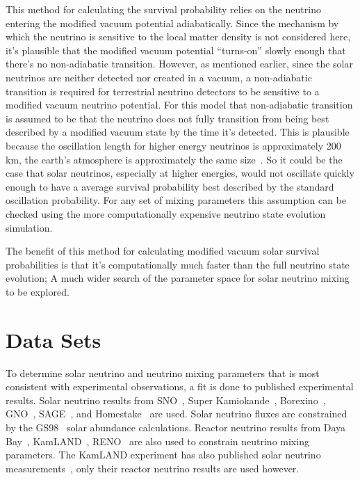This method for calculating the survival probability relies
on the neutrino entering the modified vacuum potential adiabatically.
Since the mechanism by which the neutrino is sensitive to the local matter
density is not considered here, it's plausible that the modified
vacuum potential ``turns-on'' slowly enough that there's no non-adiabatic
transition.
However, as mentioned earlier, since the solar neutrinos are neither
detected nor created in a vacuum, a non-adiabatic transition is required
for terrestrial neutrino detectors to be sensitive to a modified vacuum
neutrino potential.
For this model that non-adiabatic transition is assumed to be that the
neutrino does not fully transition from being best described
by a modified vacuum state by the time it's detected.
This is plausible because the oscillation length for higher
energy neutrinos is approximately 200\,km, the earth's atmosphere
is approximately the same size~\citep{atmosphere_profile}.
So it could be the case that solar neutrinos, especially at higher
energies, would not oscillate quickly enough to have a average
survival probability best described by the standard oscillation
probability.
For any set of mixing parameters this assumption can be checked using the
more computationally expensive neutrino state evolution simulation.

The benefit of this method for calculating modified vacuum solar survival
probabilities is that it's computationally much faster than the full
neutrino state evolution;
A much wider search of the parameter space for solar neutrino
mixing to be explored.

\section{Data Sets}
To determine solar neutrino and neutrino mixing parameters that is most
consistent with experimental observations, a fit is done to published
experimental results.
Solar neutrino results from SNO~\citep{sno_combined}, Super
Kamiokande~\citep{superk4, superk_first_solar,superk2, superk3},
Borexino~\citep{borexino_final_results,borexino_nature}, GNO~\citep{gallex, gno},
SAGE~\citep{sage}, and Homestake~\citep{homestake} are used.
Solar neutrino fluxes are constrained by the GS98~\citep{gs98} solar abundance calculations.
Reactor neutrino results from Daya Bay~\citep{daya_bay}, KamLAND~\citep{kamland_reactor, kamland_data_release}, RENO~\citep{reno}
are also used to constrain neutrino mixing parameters.
The KamLAND experiment has also published solar neutrino
measurements~\citep{kamland_be7, kamland_b8},
only their reactor neutrino results are used however.

